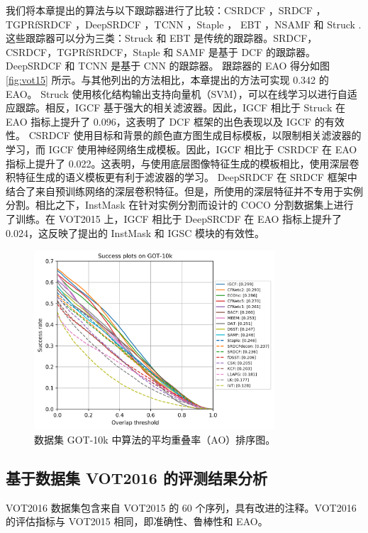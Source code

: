 我们将本章提出的算法与以下跟踪器进行了比较：CSRDCF \cite{Lukezic2017DiscriminativeCF}，SRDCF \cite{Danelljan2015LearningSR}，TGPRfSRDCF \cite{gao2018tracking}，DeepSRDCF \cite{Danelljan2015ConvolutionalFF}，TCNN \cite{nam2016modeling}，Staple \cite{Bertinetto2016StapleC}， EBT \cite{Zhu2016BeyondLS}，NSAMF \cite{Hua2015OnlineOT} 和 Struck \cite{Hare2011StruckSO}.
这些跟踪器可以分为三类：Struck 和 EBT 是传统的跟踪器。SRDCF，CSRDCF，TGPRfSRDCF，Staple 和 SAMF 是基于 DCF 的跟踪器。DeepSRDCF 和 TCNN 是基于 CNN 的跟踪器。
跟踪器的 EAO 得分如图 \ref{fig:vot15} 所示。与其他列出的方法相比，本章提出的方法可实现 0.342 的 EAO。
Struck 使用核化结构输出支持向量机（SVM），可以在线学习以进行自适应跟踪。相反，IGCF 基于强大的相关滤波器。因此，IGCF 相比于 Struck 在 EAO 指标上提升了 0.096，这表明了 DCF 框架的出色表现以及 IGCF 的有效性。
CSRDCF 使用目标和背景的颜色直方图生成目标模板，以限制相关滤波器的学习，而 IGCF 使用神经网络生成模板。因此，IGCF 相比于 CSRDCF 在 EAO 指标上提升了 0.022。这表明，与使用底层图像特征生成的模板相比，使用深层卷积特征生成的语义模板更有利于滤波器的学习。
DeepSRDCF 在 SRDCF 框架中结合了来自预训练网络的深层卷积特征。但是，所使用的深层特征并不专用于实例分割。相比之下，InstMask 在针对实例分割而设计的 COCO 分割数据集上进行了训练。在 VOT2015 上，IGCF 相比于 DeepSRCDF 在 EAO 指标上提升了 0.024，这反映了提出的 InstMask 和 IGSC 模块的有效性。

\begin{figure}[t]
    \centering
    \includegraphics[width=0.8\textwidth]{Img/IGCF/got10k/success_plot.png}
    \caption{数据集 GOT-10k \cite{GOT-10k} 中算法的平均重叠率（AO）排序图。}
    \label{fig:IGCF_got10k}
\end{figure}

\subsection{基于数据集 VOT2016 的评测结果分析}
VOT2016 \cite{Kristan2016TheVO} 数据集包含来自 VOT2015 的 60 个序列，具有改进的注释。VOT2016 的评估指标与 VOT2015 相同，即准确性、鲁棒性和 EAO。

